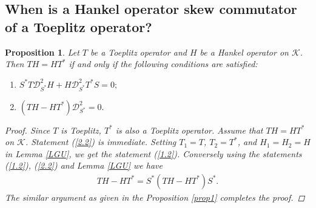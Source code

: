 \documentclass[12pt, reqno]{amsart}
\newtheorem{proposition}[theorem]{Proposition}
\theoremstyle{definition}
\theoremstyle{remark}
\numberwithin{equation}{section}
\newcommand{\ck}{\mathcal{K}}
\begin{document}
    \subsection{When is a Hankel operator skew commutator of a Toeplitz operator?}
    \begin{proposition}\label{prop2}
        Let $T$ be a Toeplitz operator and $H$ be a Hankel operator on $\ck$. Then $TH=HT^*$ if and only if the following conditions are satisfied:
        \begin{enumerate}
            \item $S^*T\mathcal{D}^2_{S^*} H+H\mathcal{D}^2_{S^*} T^*S=0;$\label{1.2}
            \item $(TH-HT^*)\mathcal{D}^2_{S^*}=0.$\label{2.2}
        \end{enumerate}
        \begin{proof}
             Since $T$ is Toeplitz, $T^*$ is also a Toeplitz operator. Assume that $TH=HT^*$ on $\ck$. Statement (\ref{2.2}) is immediate. Setting $T_1=T$, $T_2=T^*$, and  $H_1=H_2=H$ in Lemma \ref{LGU}, we get the statement (\ref{1.2}). Conversely using the statements (\ref{1.2}), (\ref{2.2}) and Lemma \ref{LGU} we have
             \begin{align*}
                 TH-HT^*=S^*(TH-HT^*)S^*.
             \end{align*}
            The similar argument as given in the Proposition \ref{prop1} completes the proof.
        \end{proof}
    \end{proposition}
    
\end{document}
